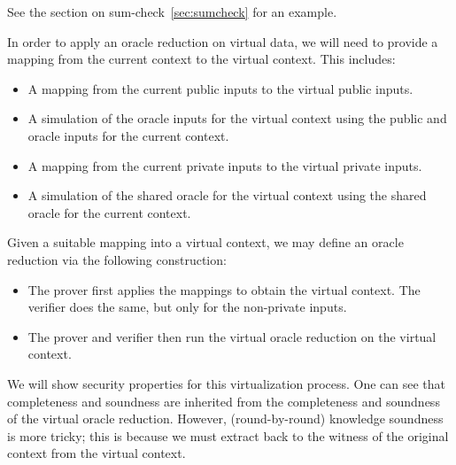 See the section on sum-check~\ref{sec:sumcheck} for an example.

\begin{definition}
    \label{def:virtual_context_mapping}
    In order to apply an oracle reduction on virtual data, we will need to provide a mapping from the current context to the virtual context. This includes:
    \begin{itemize}
        \item A mapping from the current public inputs to the virtual public inputs.
        \item A simulation of the oracle inputs for the virtual context using the public and oracle
        inputs for the current context.
        \item A mapping from the current private inputs to the virtual private inputs.
        \item A simulation of the shared oracle for the virtual context using the shared oracle for
        the current context.
    \end{itemize}
\end{definition}

\begin{definition}
    \label{def:virtual_oracle_reduction}
    Given a suitable mapping into a virtual context, we may define an oracle reduction via the following construction:
    \begin{itemize}
        \item The prover first applies the mappings to obtain the virtual context. The verifier does the same, but only for the non-private inputs.
        \item The prover and verifier then run the virtual oracle reduction on the virtual context.
    \end{itemize}
\end{definition}

We will show security properties for this virtualization process. One can see that completeness and soundness are inherited from the completeness and soundness of the virtual oracle reduction. However, (round-by-round) knowledge soundness is more tricky; this is because we must extract back to the witness of the original context from the virtual context.


